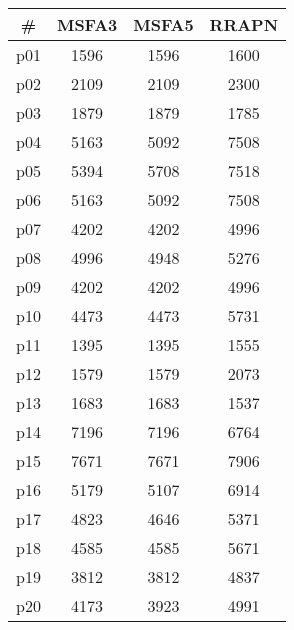 \begin{tabular}{cccc}
\toprule
\textbf{\#} & \textbf{MSFA3} & \textbf{MSFA5} & \textbf{RRAPN}\\
\midrule
p01 & 1596 & 1596 & 1600\\
p02 & 2109 & 2109 & 2300\\
p03 & 1879 & 1879 & 1785\\
p04 & 5163 & 5092 & 7508\\
p05 & 5394 & 5708 & 7518\\
p06 & 5163 & 5092 & 7508\\
p07 & 4202 & 4202 & 4996\\
p08 & 4996 & 4948 & 5276\\
p09 & 4202 & 4202 & 4996\\
p10 & 4473 & 4473 & 5731\\
p11 & 1395 & 1395 & 1555\\
p12 & 1579 & 1579 & 2073\\
p13 & 1683 & 1683 & 1537\\
p14 & 7196 & 7196 & 6764\\
p15 & 7671 & 7671 & 7906\\
p16 & 5179 & 5107 & 6914\\
p17 & 4823 & 4646 & 5371\\
p18 & 4585 & 4585 & 5671\\
p19 & 3812 & 3812 & 4837\\
p20 & 4173 & 3923 & 4991\\
\bottomrule
\end{tabular}

